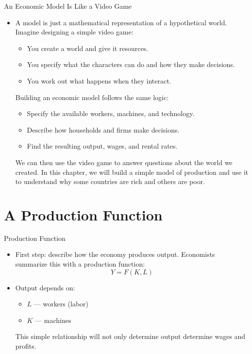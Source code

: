 \documentclass[10pt,aspectratio=169]{beamer}
\begin{document}
\begin{frame}{An Economic Model Is Like a Video Game}
\begin{itemize}
    \item A model is just a mathematical representation of a hypothetical world.
    \itemvso Imagine designing a simple video game:
    \begin{itemize}
        \item You create a world and give it resources.
        \item You specify what the characters can do and how they make decisions.
        \item You work out what happens when they interact.
    \end{itemize}

    \itemvso Building an economic model follows the same logic:
    \begin{itemize}
        \item Specify the available workers, machines, and technology.
        \item Describe how households and firms make decisions.
        \item Find the resulting output, wages, and rental rates.
    \end{itemize}

    \itemvso We can then use the video game to answer questions about the world we created.
    \itemvso In this chapter, we will build a simple model of production and use it to understand why some countries are rich and others are poor.
\end{itemize}
\end{frame}


\section{A Production Function}
\begin{frame}{Production Function}

\begin{itemize}
    \item First step: describe how the economy produces output.
    \itemvso Economists summarize this with a production function:
    \[
    Y = F(K, L)
    \]
    \vspace{-0.3cm}
    \item Output depends on:
    \begin{itemize}
        \item $L$ — workers (labor)
        \item $K$ — machines
    \end{itemize}

    \itemvso This simple relationship will not only determine output determine wages and profits.
\end{itemize}

\end{frame}
\end{document}
